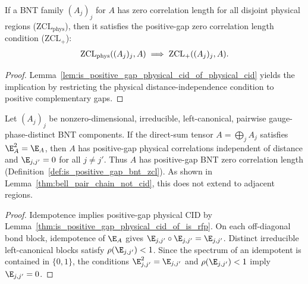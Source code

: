 \begin{lemma}%
    \label{lem:is_positive_gap_bnt_zcl_of_source_bnt_zcl}
    \leanok
    If a BNT family $(A_j)_j$ for $A$ has zero correlation length for all
    disjoint physical regions ($\mathrm{ZCL}_{\mathrm{phys}}$), then it satisfies
    the positive-gap zero correlation length condition ($\mathrm{ZCL}_+$):
    \begin{align}
        \mathrm{ZCL}_{\mathrm{phys}}((A_j)_j, A) \implies \mathrm{ZCL}_+((A_j)_j, A).
        \notag
    \end{align}
\end{lemma}
\begin{proof}\leanok
    Lemma~\ref{lem:is_positive_gap_physical_cid_of_physical_cid} yields the
    implication by restricting the physical distance-independence condition to
    positive complementary gaps.
\end{proof}

\begin{lemma}%
    \label{thm:is_positive_gap_bnt_zcl_of_is_rfp_direct_sum}
    \leanok
    Let $(A_j)_j$ be nonzero-dimensional, irreducible, left-canonical,
    pairwise gauge-phase-distinct BNT components. If the direct-sum tensor
    $A=\bigoplus_j A_j$ satisfies $\E_A^2=\E_A$, then $A$ has positive-gap
    physical correlations independent of distance and $\E_{j,j'}=0$ for all
    $j\ne j'$. Thus $A$ has positive-gap BNT zero correlation length
    (Definition~\ref{def:is_positive_gap_bnt_zcl}). As shown in
    Lemma~\ref{thm:bell_pair_chain_not_cid}, this does not extend to adjacent
    regions.
\end{lemma}
\begin{proof}\leanok
    Idempotence implies positive-gap physical CID by
    Lemma~\ref{thm:is_positive_gap_physical_cid_of_is_rfp}. On each
    off-diagonal bond block, idempotence of $\E_A$ gives
    $\E_{j,j'}\circ\E_{j,j'}=\E_{j,j'}$. Distinct irreducible left-canonical
    blocks satisfy $\rho(\E_{j,j'})<1$. Since the spectrum of an idempotent is
    contained in $\{0,1\}$, the conditions
    $\E_{j,j'}^2=\E_{j,j'}$ and $\rho(\E_{j,j'})<1$ imply
    $\E_{j,j'}=0$.
\end{proof}

